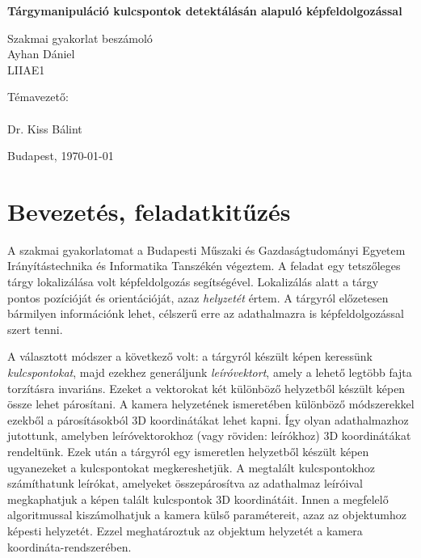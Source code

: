 \documentclass{article}
\begin{document}
	\begin{titlepage}	
		\vspace*{5 cm}
		\begin{center}
			\Huge \textbf{Tárgymanipuláció kulcspontok detektálásán alapuló képfeldolgozással}
			\LARGE
			
			Szakmai gyakorlat beszámoló\\
			\vspace{12pt} \normalsize
			Ayhan Dániel\\
			LIIAE1
		\end{center}
		\vspace{6 cm}
		Témavezető:\\
		\\		
		Dr. Kiss Bálint
		\begin{center}		
			\vfill
			Budapest, \today	
		\end{center}
	\end{titlepage}
	\newpage
	
	\thispagestyle{empty}
	\tableofcontents
	
	\setlength{\parindent}{0 em}	
	\setlength{\parskip}{1em}
	
	\newpage
	\setcounter{page}{1}
	\section{Bevezetés, feladatkitűzés}
	A szakmai gyakorlatomat a Budapesti Műszaki és Gazdaságtudományi Egyetem Irányítástechnika és Informatika Tanszékén végeztem. A feladat egy tetszőleges tárgy lokalizálása volt képfeldolgozás segítségével. Lokalizálás alatt a tárgy pontos pozícióját és orientációját, azaz \textit{helyzetét} értem. A tárgyról előzetesen bármilyen információnk lehet, célszerű erre az adathalmazra is képfeldolgozással szert tenni. 
	
	A választott módszer a következő volt: a tárgyról készült képen keressünk \textit{kulcspontokat}, majd ezekhez generáljunk \textit{leíróvektort}, amely a lehető legtöbb fajta torzításra invariáns. Ezeket a vektorokat két különböző helyzetből készült képen össze lehet párosítani. A kamera helyzetének ismeretében különböző módszerekkel ezekből a párosításokból 3D koordinátákat lehet kapni. Így olyan adathalmazhoz jutottunk, amelyben leíróvektorokhoz (vagy röviden: leírókhoz) 3D koordinátákat rendeltünk. Ezek után a tárgyról egy ismeretlen helyzetből készült képen ugyanezeket a kulcspontokat megkereshetjük. A megtalált kulcspontokhoz számíthatunk leírókat, amelyeket összepárosítva az adathalmaz leíróival megkaphatjuk a képen talált kulcspontok 3D koordinátáit. Innen a megfelelő algoritmussal kiszámolhatjuk a kamera külső paramétereit, azaz az objektumhoz képesti helyzetét. Ezzel meghatároztuk az objektum helyzetét a kamera koordináta-rendszerében.
	
\end{document}
